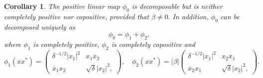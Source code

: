 \documentclass[12pt,a4paper]{amsart}
\theoremstyle{plain}
\newtheorem{corollary}[theorem]{Corollary}
\theoremstyle{remark}
\theoremstyle{definition}
\begin{document}
\begin{corollary} %
The positive linear map $\phi_0$ is decomposable but is neither completely positive nor copositive, provided that $\beta \ne 0.$ In addition, $\phi_0$ can be decomposed uniquely as
$$\phi_0 =\phi_1 +\phi_2,$$
where $\phi_1$ is completely positive, $\phi_2$ is completely copositive and  
$$
\phi_1(xx^*) = \left( \begin{array}{ll}
	\delta^{-1/2}|x_1|^2 & x_1\overline{x}_2 \\
	\overline{x}_1x_2   & \sqrt{\delta} |x_{2}|^2,	  
\end{array} \right), \quad  
\phi_2(xx^*) = |\beta| \left( \begin{array}{ll}
\delta^{-1/2}|x_1|^2 & x_2\overline{x}_1 \\
	 \overline{x}_2x_1   & \sqrt{\delta}|x_{2}|^2,	  
\end{array} \right).
$$
\end{corollary} 
\end{document}

